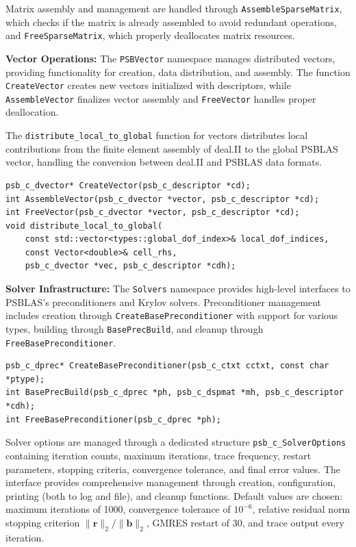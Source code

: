 \documentclass[a4paper,12pt]{article}
\begin{document}
Matrix assembly and management are handled through \texttt{AssembleSparseMatrix}, which
checks if the matrix is already assembled to avoid redundant operations,
and \texttt{FreeSparseMatrix}, which properly deallocates matrix resources.

\textbf{Vector Operations:} The \texttt{PSBVector} namespace manages distributed vectors,
providing functionality for creation, data distribution, and assembly.
The function \texttt{CreateVector} creates new vectors initialized with descriptors,
while \texttt{AssembleVector} finalizes vector assembly and \texttt{FreeVector} handles proper
deallocation.

The \texttt{distribute\_local\_to\_global} function for vectors distributes local
contributions from the finite element assembly of deal.II to the global PSBLAS vector,
handling the conversion between deal.II and PSBLAS data formats.

\begin{lstlisting}[caption=Vector operations]
psb_c_dvector* CreateVector(psb_c_descriptor *cd);
int AssembleVector(psb_c_dvector *vector, psb_c_descriptor *cd);
int FreeVector(psb_c_dvector *vector, psb_c_descriptor *cd);
void distribute_local_to_global(
    const std::vector<types::global_dof_index>& local_dof_indices,
    const Vector<double>& cell_rhs,
    psb_c_dvector *vec, psb_c_descriptor *cdh);
\end{lstlisting}

\textbf{Solver Infrastructure:} The \texttt{Solvers} namespace provides high-level
interfaces to PSBLAS's preconditioners and Krylov solvers. Preconditioner management
includes creation through \texttt{CreateBasePreconditioner} with support for various
types, building through \texttt{BasePrecBuild}, and cleanup through
\texttt{FreeBasePreconditioner}.

\begin{lstlisting}[caption=Preconditioner and solver management]
psb_c_dprec* CreateBasePreconditioner(psb_c_ctxt cctxt, const char *ptype);
int BasePrecBuild(psb_c_dprec *ph, psb_c_dspmat *mh, psb_c_descriptor *cdh);
int FreeBasePreconditioner(psb_c_dprec *ph);
\end{lstlisting}

Solver options are managed through a dedicated structure \texttt{psb\_c\_SolverOptions}
containing iteration counts, maximum iterations, trace frequency, restart parameters,
stopping criteria, convergence tolerance, and final error values. The interface provides
comprehensive management through creation, configuration, printing (both to log and file),
and cleanup functions. Default values are chosen: maximum iterations of 1000,
convergence tolerance of $10^{-6}$, relative residual norm stopping criterion
$\|\mathbf{r}\|_2/\|\mathbf{b}\|_2$, GMRES restart of 30, and trace output every iteration.
\end{document}
